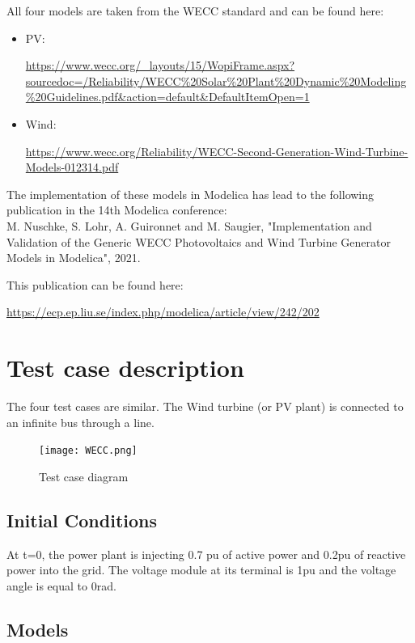 \documentclass[a4paper, 12pt]{report}
\begin{document}
All four models are taken from the WECC standard and can be found here:
\begin{itemize}
\item PV:

\url{https://www.wecc.org/\_layouts/15/WopiFrame.aspx?sourcedoc=/Reliability/WECC\%20Solar\%20Plant\%20Dynamic\%20Modeling\%20Guidelines.pdf\&action=default\&DefaultItemOpen=1}

\item Wind:

\url{https://www.wecc.org/Reliability/WECC-Second-Generation-Wind-Turbine-Models-012314.pdf}
\end{itemize}

The implementation of these models in Modelica has lead to the following publication in the 14th Modelica conference:\\

M. Nuschke, S. Lohr, A. Guironnet and M. Saugier, "Implementation and Validation of the Generic WECC Photovoltaics and Wind Turbine Generator Models in Modelica", 2021.\\

\par This publication can be found here:

\url{https://ecp.ep.liu.se/index.php/modelica/article/view/242/202}

\section{Test case description}

\par The four test cases are similar. The Wind turbine (or PV plant) is connected to an infinite bus through a line.

\begin{figure}[H]
  \texttt{[image: WECC.png]}
  \caption{Test case diagram}
\end{figure}

\subsection{Initial Conditions}

\par At t=0, the power plant is injecting 0.7 pu of active power and 0.2pu of reactive power into the grid. The voltage module at its terminal is 1pu and the voltage angle is equal to 0rad.

\subsection{Models}
\end{document}
